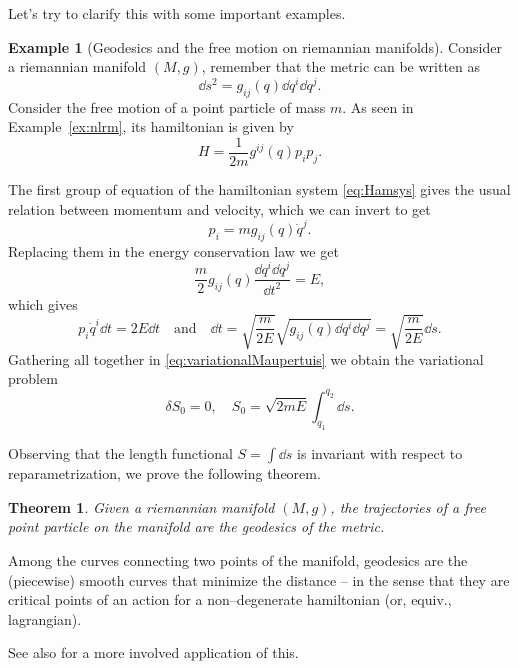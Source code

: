 \documentclass[english,fontsize=11pt,paper=b5]{scrbook}
\newtheorem{theorem}{Theorem}[chapter]
\theoremstyle{definition}
\newtheorem{example}{Example}[chapter]
\begin{document}
    Let's try to clarify this with some important examples.

    \begin{example}[Geodesics and the free motion on riemannian manifolds]
      Consider a riemannian manifold $(M, g)$, remember that the metric  can be written as
      \begin{equation}
        \dd s^2 = g_{ij}(q)\dd q^i \dd q^j.
      \end{equation}
      Consider the free motion of a point particle of mass $m$. As seen in Example~\ref{ex:nlrm}, its hamiltonian is given by
      \begin{equation}
        H = \frac1{2m} g^{ij}(q) p_i p_j.
      \end{equation}

      The first group of equation of the hamiltonian system \eqref{eq:Hamsys} gives the usual relation between momentum and velocity, which we can invert to get
      \begin{equation}
        p_i = m g_{ij}(q)\dot q^j.
      \end{equation}
      Replacing them in the energy conservation law we get
      \begin{equation}
        \frac m2 g_{ij}(q)\frac{\dd q^i \dd q^j}{\dd t^2} = E,
      \end{equation}
      which gives
      \begin{equation}
        p_i\dot q^i \dd t= 2E \dd t
        \quad\mbox{and}\quad
        \dd t = \sqrt{\frac{m}{2E}}\sqrt{g_{ij}(q)\dd q^i \dd q^j} = \sqrt{\frac{m}{2E}} \dd s.
      \end{equation}
      Gathering all together in \eqref{eq:variationalMaupertuis} we obtain the variational problem
      \begin{equation}
        \delta S_0 = 0, \quad S_0 = \sqrt{2mE}\int_{q_1}^{q_2} \dd s.
      \end{equation}

      Observing that the length functional $S = \int \dd s$ is invariant with respect to reparametrization, we prove the following theorem.
      \begin{theorem}
        Given a riemannian manifold $(M,g)$, the trajectories of a free point particle on the manifold are the geodesics of the metric.
      \end{theorem}

      Among the curves connecting two points of the manifold, geodesics are the (piecewise) smooth curves that minimize the distance -- in the sense that they are critical points of an action for a non--degenerate hamiltonian (or, equiv., lagrangian).

      See also \cite{Bolsinov_1995} for a more involved application of this.
    \end{example}
\end{document}
